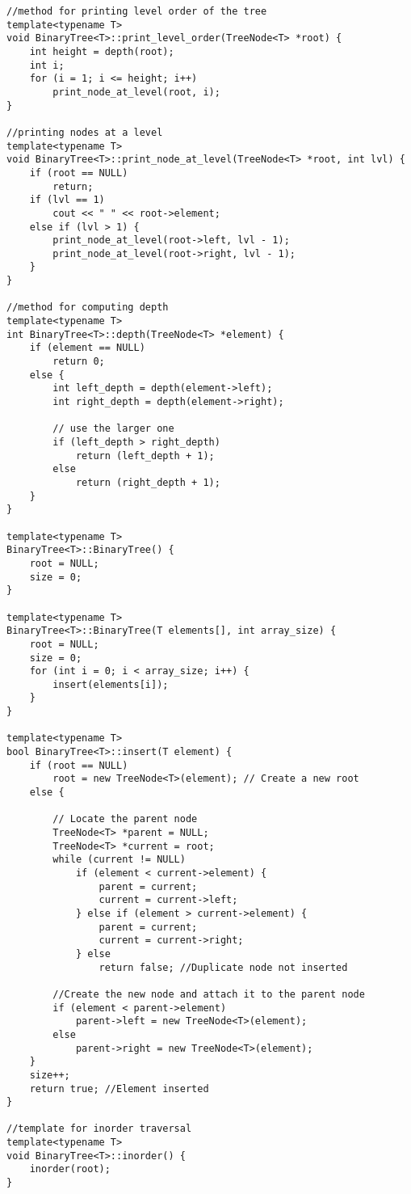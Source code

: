\documentclass[11pt]{article}
\begin{document}
\begin{lstlisting}
//method for printing level order of the tree
template<typename T>
void BinaryTree<T>::print_level_order(TreeNode<T> *root) {
    int height = depth(root);
    int i;
    for (i = 1; i <= height; i++)
        print_node_at_level(root, i);
}

//printing nodes at a level
template<typename T>
void BinaryTree<T>::print_node_at_level(TreeNode<T> *root, int lvl) {
    if (root == NULL)
        return;
    if (lvl == 1)
        cout << " " << root->element;
    else if (lvl > 1) {
        print_node_at_level(root->left, lvl - 1);
        print_node_at_level(root->right, lvl - 1);
    }
}

//method for computing depth
template<typename T>
int BinaryTree<T>::depth(TreeNode<T> *element) {
    if (element == NULL)
        return 0;
    else {
        int left_depth = depth(element->left);
        int right_depth = depth(element->right);

        // use the larger one
        if (left_depth > right_depth)
            return (left_depth + 1);
        else
            return (right_depth + 1);
    }
}

template<typename T>
BinaryTree<T>::BinaryTree() {
    root = NULL;
    size = 0;
}

template<typename T>
BinaryTree<T>::BinaryTree(T elements[], int array_size) {
    root = NULL;
    size = 0;
    for (int i = 0; i < array_size; i++) {
        insert(elements[i]);
    }
}

template<typename T>
bool BinaryTree<T>::insert(T element) {
    if (root == NULL)
        root = new TreeNode<T>(element); // Create a new root
    else {

        // Locate the parent node
        TreeNode<T> *parent = NULL;
        TreeNode<T> *current = root;
        while (current != NULL)
            if (element < current->element) {
                parent = current;
                current = current->left;
            } else if (element > current->element) {
                parent = current;
                current = current->right;
            } else
                return false; //Duplicate node not inserted

        //Create the new node and attach it to the parent node
        if (element < parent->element)
            parent->left = new TreeNode<T>(element);
        else
            parent->right = new TreeNode<T>(element);
    }
    size++;
    return true; //Element inserted
}

//template for inorder traversal
template<typename T>
void BinaryTree<T>::inorder() {
    inorder(root);
}


\end{lstlisting}
\end{document}
